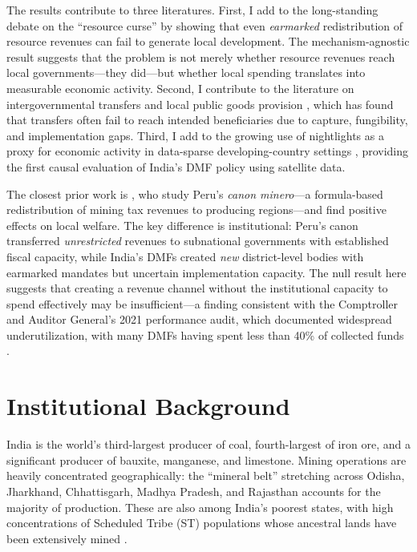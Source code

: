 \documentclass[12pt]{article}
\begin{document}
The results contribute to three literatures. First, I add to the long-standing debate on the ``resource curse'' \citep{sachs2001curse, van2011local, cust2017dutch} by showing that even \textit{earmarked} redistribution of resource revenues can fail to generate local development. The mechanism-agnostic result suggests that the problem is not merely whether resource revenues reach local governments---they did---but whether local spending translates into measurable economic activity. Second, I contribute to the literature on intergovernmental transfers and local public goods provision \citep{litschig2012impact, reinikka2004local, besley2004political}, which has found that transfers often fail to reach intended beneficiaries due to capture, fungibility, and implementation gaps. Third, I add to the growing use of nightlights as a proxy for economic activity in data-sparse developing-country settings \citep{asher2021development, gibson2021night}, providing the first causal evaluation of India's DMF policy using satellite data.

The closest prior work is \citet{aragon2013natural}, who study Peru's \textit{canon minero}---a formula-based redistribution of mining tax revenues to producing regions---and find positive effects on local welfare. The key difference is institutional: Peru's canon transferred \textit{unrestricted} revenues to subnational governments with established fiscal capacity, while India's DMFs created \textit{new} district-level bodies with earmarked mandates but uncertain implementation capacity. The null result here suggests that creating a revenue channel without the institutional capacity to spend effectively may be insufficient---a finding consistent with the Comptroller and Auditor General's 2021 performance audit, which documented widespread underutilization, with many DMFs having spent less than 40\% of collected funds \citep{cag2021dmf}.

\section{Institutional Background}

India is the world's third-largest producer of coal, fourth-largest of iron ore, and a significant producer of bauxite, manganese, and limestone. Mining operations are heavily concentrated geographically: the ``mineral belt'' stretching across Odisha, Jharkhand, Chhattisgarh, Madhya Pradesh, and Rajasthan accounts for the majority of production. These are also among India's poorest states, with high concentrations of Scheduled Tribe (ST) populations whose ancestral lands have been extensively mined \citep{pande2003can}.
\end{document}
